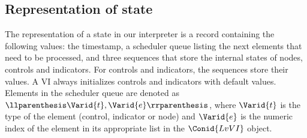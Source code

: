 \subsection{Representation of state}

The representation of a state in our interpreter is a record containing the
following values: the timestamp, a scheduler queue listing the next elements
that need to be processed, and three sequences that store the internal states
of nodes, controls and indicators. For controls and indicators, the sequences
store their values. A VI always initializes controls and indicators with
default values. Elements in the scheduler queue are denoted as \ensuremath{\llparenthesis \Varid{t}, \Varid{e}\rrparenthesis }, where \ensuremath{\Varid{t}} is the type of the element (control, indicator or node) and \ensuremath{\Varid{e}}
is the numeric index of the element in its appropriate list in the \ensuremath{\Conid{LvVI}}
object.

